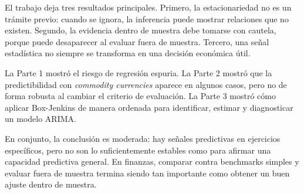 \documentclass[11pt,a4paper]{article}
\begin{document}
El trabajo deja tres resultados principales. Primero, la estacionariedad no es un trámite previo: cuando se ignora, la inferencia puede mostrar relaciones que no existen. Segundo, la evidencia dentro de muestra debe tomarse con cautela, porque puede desaparecer al evaluar fuera de muestra. Tercero, una señal estadística no siempre se transforma en una decisión económica útil.

La Parte 1 mostró el riesgo de regresión espuria. La Parte 2 mostró que la predictibilidad con \textit{commodity currencies} aparece en algunos casos, pero no de forma robusta al cambiar el criterio de evaluación. La Parte 3 mostró cómo aplicar Box-Jenkins de manera ordenada para identificar, estimar y diagnosticar un modelo ARIMA.

En conjunto, la conclusión es moderada: hay señales predictivas en ejercicios específicos, pero no son lo suficientemente estables como para afirmar una capacidad predictiva general. En finanzas, comparar contra benchmarks simples y evaluar fuera de muestra termina siendo tan importante como obtener un buen ajuste dentro de muestra.
\end{document}
